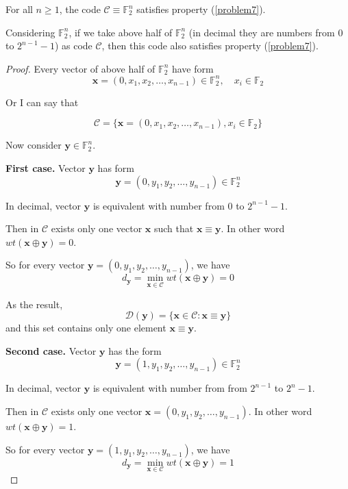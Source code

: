 \documentclass{article}
\newcommand{\FF}{\mathbb{F}}
\begin{document}
\begin{conclusion}
    For all $n \geq 1$, the code $\mathcal{C} \equiv \FF_2^n$ satisfies property (\ref{problem7}).
\end{conclusion}

\begin{remark}
    Considering $\FF_2^n$, if we take above half of $\FF_2^n$ (in decimal they are numbers from 0 to $2^{n-1}-1$) as code $\mathcal{C}$, then this code also satisfies property (\ref{problem7}).
\end{remark}

\begin{proof}
    Every vector of above half of $\FF_2^n$ have form \[ \bm{x} = (0, x_1, x_2, \ldots, x_{n-1}) \in \FF_2^n, \quad x_i \in \FF_2 \]

    Or I can say that

    \begin{equation*}
        \mathcal{C} = \{ \bm{x} = (0, x_1, x_2, \ldots, x_{n-1}), x_i \in \FF_2 \}
    \end{equation*}

    Now consider $\bm{y} \in \FF_2^n$.

    \textbf{First case.} Vector $\bm{y}$ has form \[ \bm{y} = (0, y_1, y_2, \ldots, y_{n-1}) \in \FF_2^n \]

    In decimal, vector $\bm{y}$ is equivalent with number from $0$ to $2^{n-1}-1$.

    Then in $\mathcal{C}$ exists only one vector $\bm{x}$ such that $\bm{x} \equiv \bm{y}$. In other word $wt(\bm{x} \oplus \bm{y}) = 0$.

    So for every vector $\bm{y} = (0, y_1, y_2, \ldots, y_{n-1})$, we have \[ d_{\bm{y}} = \min_{\bm{x} \in \mathcal{C}} wt(\bm{x} \oplus \bm{y}) = 0 \]

    As the result, \[ \mathcal{D}(\bm{y}) = \{ \bm{x} \in \mathcal{C} : \bm{x} \equiv \bm{y} \} \] and this set contains only one element $\bm{x} \equiv \bm{y}$.

    \textbf{Second case.} Vector $\bm{y}$ has the form \[ \bm{y} = (1, y_1, y_2, \ldots, y_{n-1}) \in \FF_2^n \]

    In decimal, vector $\bm{y}$ is equivalent with number from from $2^{n-1}$ to $2^n-1$.

    Then in $\mathcal{C}$ exists only one vector $\bm{x} = (0, y_1, y_2, \ldots, y_{n-1})$. In other word $wt(\bm{x} \oplus \bm{y}) = 1$.

    So for every vector $\bm{y} = (1, y_1, y_2, \ldots, y_{n-1})$, we have \[ d_{\bm{y}} = \min_{\bm{x} \in \mathcal{C}} wt(\bm{x} \oplus \bm{y}) = 1 \]


\end{proof}
\end{document}

